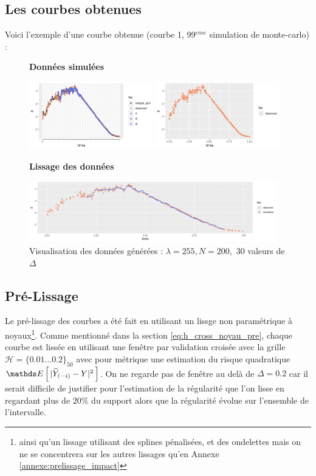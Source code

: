 \subsection{Les courbes obtenues}

Voici l'exemple d'une courbe obtenue (courbe 1, 99$^{eme}$ simulation de monte-carlo) :

\begin{figure}[H]
	\centering
	\textbf{Données simulées}

	\includegraphics[width=0.48\textwidth]{Images/simul/all.jpeg}
	\includegraphics[width=0.48\textwidth]{Images/simul/observed.jpeg}

	\textbf{Lissage des données}

	\includegraphics[width=0.96\textwidth]{Images/simul/smoothed.jpeg}
	\caption{Visualisation des données générées : $\lambda = 255, N = 200,$ 30 valeurs de $\Delta$}
\end{figure}


\subsection{Pré-Lissage}

Le pré-lissage des courbes a été fait en utilisant un lissge non paramétrique à noyaux\footnote{ainsi qu'un lissage utilisant des splines pénalisées, et des ondelettes mais on ne se concentrera sur les autres lissages qu'en Annexe \ref{annexe:prelissage_impact}}. Comme mentionné dans la section \ref{eq:h_cross_noyau_pre}, chaque courbe est lissée en utilisant une fenêtre par validation croisée avec la grille $\mathcal H= \{ 0.01 \dots 0.2 \}_{50}$ avec pour métrique une estimation du risque quadratique $\esperance{|\widehat Y_{(-i)} - Y|^2}$. On ne regarde pas de fenêtre au delà de $\Delta = 0.2$ car il serait difficile de justifier pour l'estimation de la régularité que l'on lisse en regardant plus de $20$\% du support alors que la régularité évolue sur l'ensemble de l'intervalle.


